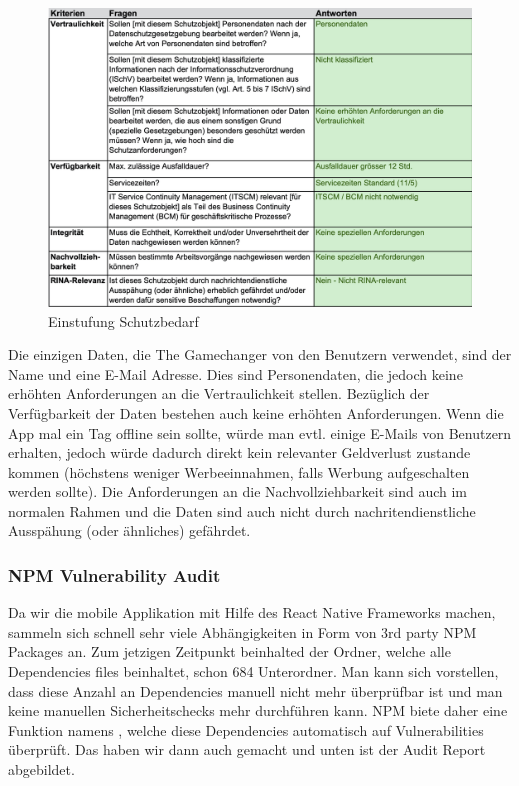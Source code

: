 \begin{figure}[H]
    \centering
    \includegraphics[width=\textwidth]{images/Einstufung_Schutzbedarf.jpg}
    \caption{Einstufung Schutzbedarf}
    \label{fig:einstufung_schutzbedarf}
\end{figure}

Die einzigen Daten, die The Gamechanger von den Benutzern verwendet, sind der Name und eine E-Mail Adresse. Dies sind Personendaten, die jedoch keine erhöhten Anforderungen an die Vertraulichkeit stellen. Bezüglich der Verfügbarkeit der Daten bestehen auch keine erhöhten Anforderungen. Wenn die App mal ein Tag offline sein sollte, würde man evtl. einige E-Mails von Benutzern erhalten, jedoch würde dadurch direkt kein relevanter Geldverlust zustande kommen (höchstens weniger Werbeeinnahmen, falls Werbung aufgeschalten werden sollte). Die Anforderungen an die Nachvollziehbarkeit sind auch im normalen Rahmen und die Daten sind auch nicht durch nachritendienstliche Ausspähung (oder ähnliches) gefährdet. 

\subsubsection{NPM Vulnerability Audit}
Da wir die mobile Applikation mit Hilfe des React Native Frameworks machen, sammeln sich schnell sehr viele Abhängigkeiten in Form von 3rd party NPM Packages an. Zum jetzigen Zeitpunkt beinhalted der  Ordner, welche alle Dependencies files beinhaltet, schon 684 Unterordner. Man kann sich vorstellen, dass diese Anzahl an Dependencies manuell nicht mehr überprüfbar ist und man keine manuellen Sicherheitschecks mehr durchführen kann. NPM biete daher eine Funktion namens , welche diese Dependencies automatisch auf Vulnerabilities überprüft. Das haben wir dann auch gemacht und unten ist der Audit Report abgebildet.


